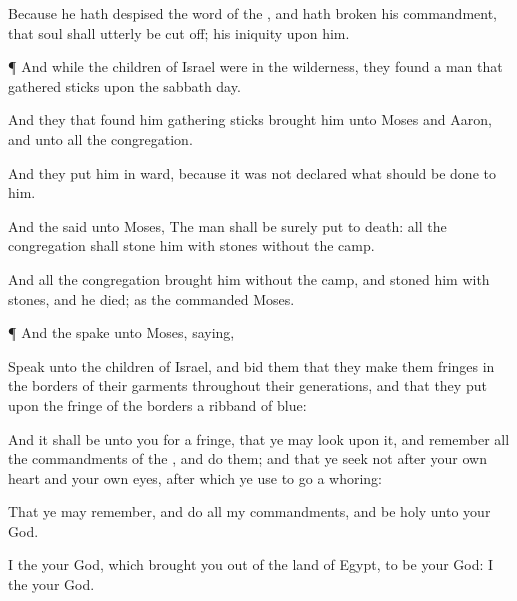 {Because he hath
despised the
word of the
{}, and hath
broken his
commandment, that
soul shall
utterly be cut
off; his
iniquity
{} upon him.


\par }{\PP {}¶ And while the
children of
Israel were in the
wilderness, they
found a
man that
gathered
sticks upon the
sabbath
day.

And they that
found him
gathering
sticks
brought him unto
Moses and
Aaron, and unto all the
congregation.

And they
put him in
ward, because it was not
declared what should be
done to him.

And the
{}
said unto
Moses, The
man shall be
surely put to
death: all the
congregation shall
stone him with
stones
without the
camp.

And all the
congregation
brought him
without the
camp, and
stoned him with
stones, and he
died; as the
{}
commanded
Moses.


\par }{\PP {}¶ And the
{}
spake unto
Moses,
saying,

Speak unto the
children of
Israel, and
bid them that they
make them
fringes in the
borders of their
garments throughout their
generations, and that they
put upon the
fringe of the
borders a
ribband of
blue:

And it shall be unto you for a
fringe, that ye may
look upon it, and
remember all the
commandments of the
{}, and
do them; and that ye
seek not
after your own
heart and your own
eyes,
after which ye use to go a
whoring:

That ye may
remember, and
do all my
commandments, and
be
holy unto your
God.

I
{} the
{} your
God, which brought you
out of the
land of
Egypt, to be your
God: I
{} the
{} your
God.




\par }
